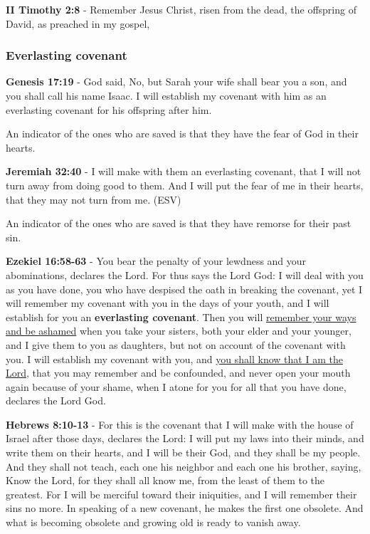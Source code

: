 \documentclass[11pt]{article}
\begin{document}
\textbf{II Timothy 2:8} - Remember Jesus Christ, risen from the dead, the offspring of David, as preached in my gospel,

\subsubsection{Everlasting covenant}
\label{sec:org6db93d2}
\textbf{Genesis 17:19} - God said, No, but Sarah your wife shall bear you a son, and you shall call his name Isaac. I will establish my covenant with him as an everlasting covenant for his offspring after him.􀧁

An indicator of the ones who are saved is that they have the fear of God in their hearts.

\textbf{Jeremiah 32:40} - I will make with them an everlasting covenant, that I will not turn away from doing good to them. And I will put the fear of me in their hearts, that they may not turn from me. (ESV)

An indicator of the ones who are saved is that they have remorse for their past sin.

\textbf{Ezekiel 16:58-63} - You bear the penalty of your lewdness and your abominations, declares the Lord.  For thus says the Lord God: I will deal with you as you have done, you who have despised the oath in breaking the covenant, yet I will remember my covenant with you in the days of your youth, and I will establish for you an \textbf{everlasting covenant}.  Then you will \uline{remember your ways and be ashamed} when you take your sisters, both your elder and your younger, and I give them to you as daughters, but not on account of the covenant with you.  I will establish my covenant with you, and \uline{you shall know that I am the Lord}, that you may remember and be confounded, and never open your mouth again because of your shame, when I atone for you for all that you have done, declares the Lord God.

\textbf{Hebrews 8:10-13} - For this is the covenant that I will make with the house of Israel after those days, declares the Lord: I will put my laws into their minds, and write them on their hearts, and I will be their God, and they shall be my people. And they shall not teach, each one his neighbor and each one his brother, saying, Know the Lord, for they shall all know me, from the least of them to the greatest. For I will be merciful toward their iniquities, and I will remember their sins no more. In speaking of a new covenant, he makes the first one obsolete. And what is becoming obsolete and growing old is ready to vanish away.
\end{document}
